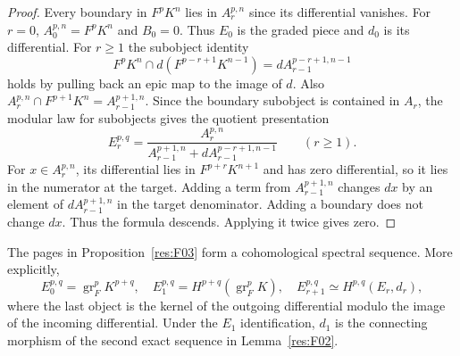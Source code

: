 \begin{proof}
Every boundary in $F^pK^n$ lies in $A_r^{p,n}$ since its differential
vanishes. For $r=0$, $A_0^{p,n}=F^pK^n$ and $B_0=0$. Thus $E_0$ is
the graded piece and $d_0$ is its differential. For $r\geq1$ the
subobject identity
\[
 F^pK^n\cap d(F^{p-r+1}K^{n-1})=d A_{r-1}^{p-r+1,n-1}
\]
holds by pulling back an epic map to the image of $d$.
Also $A_r^{p,n}\cap F^{p+1}K^n=A_{r-1}^{p+1,n}$. Since the boundary
subobject is contained in $A_r$, the modular law for subobjects
gives the quotient presentation
\begin{equation}
 \label{eq:page-quotient}
 E_r^{p,q}=
 \frac{A_r^{p,n}}
 {A_{r-1}^{p+1,n}+d A_{r-1}^{p-r+1,n-1}}\qquad(r\geq1).
\end{equation}
For $x\in A_r^{p,n}$, its differential lies in $F^{p+r}K^{n+1}$
and has zero differential, so it lies in the numerator at the
target. Adding a term from $A_{r-1}^{p+1,n}$ changes $dx$ by an
element of $dA_{r-1}^{p+1,n}$ in the target denominator. Adding a
boundary does not change $dx$. Thus the formula descends. Applying
it twice gives zero.
\end{proof}

\begin{theorem}
\label{res:F04}
The pages in Proposition~\ref{res:F03} form a cohomological
spectral sequence. More explicitly,
\[
 E_0^{p,q}=\operatorname{gr}_F^pK^{p+q},\quad
 E_1^{p,q}=H^{p+q}(\operatorname{gr}_F^pK),\quad
 E_{r+1}^{p,q}\simeq H^{p,q}(E_r,d_r),
\]
where the last object is the kernel of the outgoing differential
modulo the image of the incoming differential. Under the $E_1$
identification, $d_1$ is the connecting morphism of the second exact
sequence in Lemma~\ref{res:F02}.
\end{theorem}

